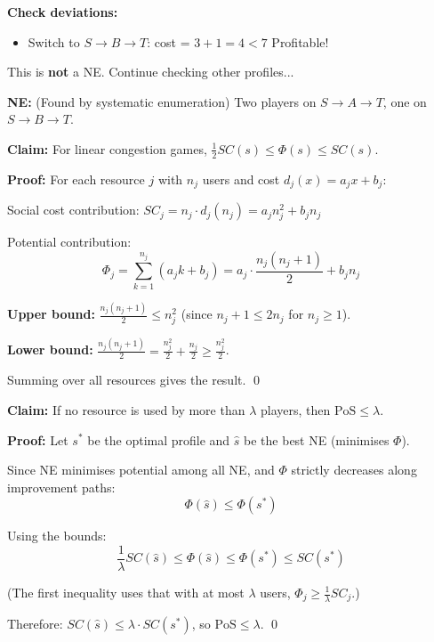 \begin{exbox}
\textbf{Check deviations:}
\begin{itemize}
  \item Switch to $S \to B \to T$: cost = $3 + 1 = 4 < 7$ \checkmark Profitable!
\end{itemize}

This is \textbf{not} a NE. Continue checking other profiles...

\textbf{NE:} (Found by systematic enumeration) Two players on $S \to A \to T$, one on $S \to B \to T$.
\end{exbox}

\begin{exbox}
\textbf{Claim:} For linear congestion games, $\frac{1}{2} SC(s) \leq \Phi(s) \leq SC(s)$.

\textbf{Proof:} For each resource $j$ with $n_j$ users and cost $d_j(x) = a_j x + b_j$:

Social cost contribution: $SC_j = n_j \cdot d_j(n_j) = a_j n_j^2 + b_j n_j$

Potential contribution: 
\[
\Phi_j = \sum_{k=1}^{n_j} (a_j k + b_j) = a_j \cdot \frac{n_j(n_j+1)}{2} + b_j n_j
\]

\textbf{Upper bound:} $\frac{n_j(n_j+1)}{2} \leq n_j^2$ (since $n_j+1 \leq 2n_j$ for $n_j \geq 1$).

\textbf{Lower bound:} $\frac{n_j(n_j+1)}{2} = \frac{n_j^2}{2} + \frac{n_j}{2} \geq \frac{n_j^2}{2}$.

Summing over all resources gives the result. \qed
\end{exbox}

\begin{exbox}
\textbf{Claim:} If no resource is used by more than $\lambda$ players, then $\text{PoS} \leq \lambda$.

\textbf{Proof:} Let $s^*$ be the optimal profile and $\hat{s}$ be the best NE (minimises $\Phi$).

Since NE minimises potential among all NE, and $\Phi$ strictly decreases along improvement paths:
\[
\Phi(\hat{s}) \leq \Phi(s^*)
\]

Using the bounds:
\[
\frac{1}{\lambda} SC(\hat{s}) \leq \Phi(\hat{s}) \leq \Phi(s^*) \leq SC(s^*)
\]

(The first inequality uses that with at most $\lambda$ users, $\Phi_j \geq \frac{1}{\lambda} SC_j$.)

Therefore: $SC(\hat{s}) \leq \lambda \cdot SC(s^*)$, so $\text{PoS} \leq \lambda$. \qed
\end{exbox}

